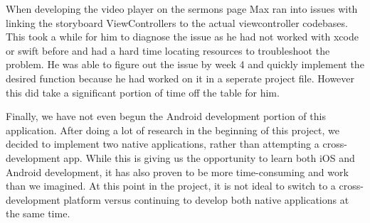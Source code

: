 \documentclass[letterpaper,10pt,draftclsnofoot,onecolumn,titlepage]{IEEEtran}
\begin{document}
		When developing the video player on the sermons page Max ran into issues with linking the storyboard ViewControllers to the actual viewcontroller codebases. 
		This took a while for him to diagnose the issue as he had not worked with xcode or swift before and had a hard time locating resources to troubleshoot the problem. 
		He was able to figure out the issue by week 4 and quickly implement the desired function because he had worked on it in a seperate project file.
		However this did take a significant portion of time off the table for him.
		
		Finally, we have not even begun the Android development portion of this application. 
		After doing a lot of research in the beginning of this project, we decided to implement two native applications, rather than attempting a cross-development app. 
		While this is giving us the opportunity to learn both iOS and Android development, it has also proven to be more time-consuming and work than we imagined. 
		At this point in the project, it is not ideal to switch to a cross-development platform versus continuing to develop both native applications at the same time.
\end{document}

